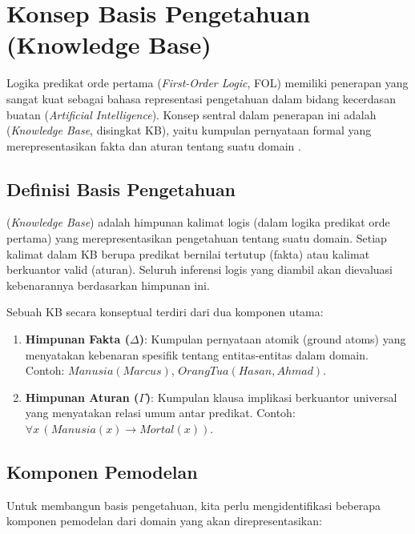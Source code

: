 \section{Konsep Basis Pengetahuan (Knowledge Base)}

Logika predikat orde pertama (\textit{First-Order Logic}, FOL) memiliki penerapan yang sangat kuat sebagai bahasa representasi pengetahuan dalam bidang kecerdasan buatan (\textit{Artificial Intelligence}). Konsep sentral dalam penerapan ini adalah  (\textit{Knowledge Base}, disingkat KB), yaitu kumpulan pernyataan formal yang merepresentasikan fakta dan aturan tentang suatu domain \cite{rosen2019}.

\subsection{Definisi Basis Pengetahuan}

\begin{definisi}
 (\textit{Knowledge Base}) adalah himpunan kalimat logis (dalam logika predikat orde pertama) yang merepresentasikan pengetahuan tentang suatu domain. Setiap kalimat dalam KB berupa predikat bernilai tertutup (fakta) atau kalimat berkuantor valid (aturan). Seluruh inferensi logis yang diambil akan dievaluasi kebenarannya berdasarkan himpunan ini.
\end{definisi}

Sebuah KB secara konseptual terdiri dari dua komponen utama:
\begin{enumerate}
    \item \textbf{Himpunan Fakta ($\Delta$)}: Kumpulan pernyataan atomik (ground atoms) yang menyatakan kebenaran spesifik tentang entitas-entitas dalam domain. Contoh: $Manusia(Marcus)$, $OrangTua(Hasan, Ahmad)$.
    \item \textbf{Himpunan Aturan ($\Gamma$)}: Kumpulan klausa implikasi berkuantor universal yang menyatakan relasi umum antar predikat. Contoh: $\forall x\, (Manusia(x) \rightarrow Mortal(x))$.
\end{enumerate}

\subsection{Komponen Pemodelan}

Untuk membangun basis pengetahuan, kita perlu mengidentifikasi beberapa komponen pemodelan dari domain yang akan direpresentasikan:

